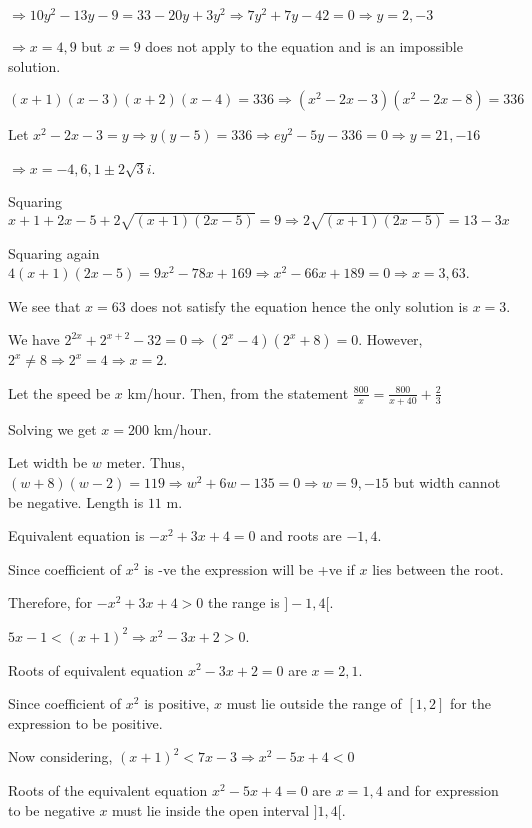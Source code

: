   $\Rightarrow 10y^2 - 13y - 9 = 33 - 20y + 3y^2\Rightarrow 7y^2 + 7y - 42 = 0\Rightarrow y = 2, -3$

  $\Rightarrow x = 4, 9$ but $x = 9$ does not apply to the equation and is an impossible solution.
\item $(x + 1)(x - 3)(x + 2)(x - 4) = 336\Rightarrow (x^2 - 2x - 3)(x^2 - 2x - 8) = 336$

  Let $x^2 - 2x - 3 = y\Rightarrow y(y - 5) = 336\Rightarrow ey^2 - 5y - 336 = 0\Rightarrow y = 21, -16$

  $\Rightarrow x = -4, 6, 1 \pm 2\sqrt{3}i$.
\item Squaring $x + 1 + 2x - 5 + 2\sqrt{(x + 1)(2x - 5)} = 9 \Rightarrow 2\sqrt{(x + 1)(2x - 5)} = 13 - 3x$

  Squaring again $4(x + 1)(2x - 5) = 9x^2 - 78x + 169 \Rightarrow x^2 - 66x + 189 = 0\Rightarrow x = 3, 63$.

  We see that $x = 63$ does not satisfy the equation hence the only solution is $x = 3$.
\item We have $2^{2x} + 2^{x + 2} - 32 = 0\Rightarrow (2^x - 4)(2^x + 8) = 0$. However, $2^x \neq
  8\Rightarrow 2^x = 4 \Rightarrow x = 2$.
\item Let the speed be $x$ km/hour. Then, from the statement $\frac{800}{x} = \frac{800}{x + 40} + \frac{2}{3}$

  Solving we get $x = 200$ km/hour.
\item Let width be $w$ meter. Thus, $(w + 8)(w - 2) = 119\Rightarrow w^2 + 6w - 135 = 0\Rightarrow w = 9,
  -15$ but width cannot be negative. Length is $11$ m.
\item Equivalent equation is $-x^2 + 3x + 4 = 0$ and roots are $-1, 4$.

  Since coefficient of $x^2$ is -ve the expression will be +ve if $x$ lies between the root.

  Therefore, for $-x^2 + 3x + 4 > 0$ the range is $]-1, 4[$.
\item $5x - 1 < (x + 1)^2 \Rightarrow x^2 - 3x + 2 > 0$.

  Roots of equivalent equation $x^2 - 3x + 2 = 0$ are $x = 2, 1$.

  Since coefficient of $x^2$ is positive, $x$ must lie outside the range of $[1, 2]$ for the expression
  to be positive.

  Now considering, $(x + 1)^2 < 7x - 3\Rightarrow x^2 - 5x + 4 < 0$

  Roots of the equivalent equation $x^2 - 5x + 4 = 0$ are $x = 1, 4$ and for expression to be negative $x$
  must lie inside the open interval $]1, 4[$.

